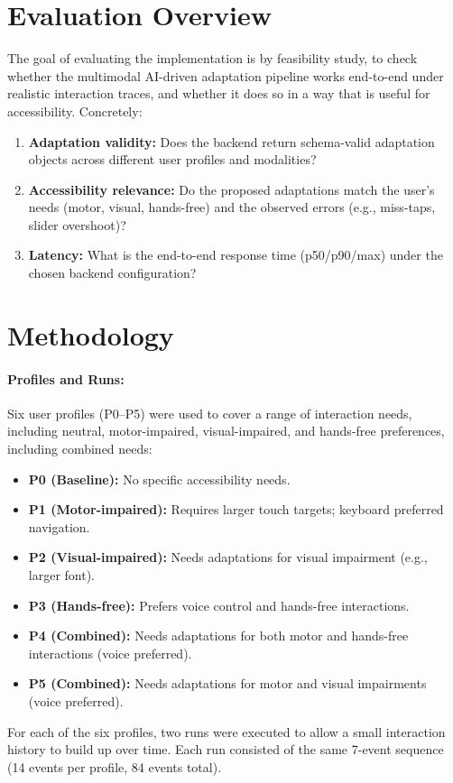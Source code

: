 \documentclass[openany]{book}
\begin{document}
\section{Evaluation Overview}
The goal of evaluating the implementation is by feasibility study, to check whether the multimodal AI-driven adaptation pipeline works end-to-end under realistic interaction traces, and whether it does so in a way that is useful for accessibility. Concretely:
\begin{enumerate}
    \item \textbf{Adaptation validity:} Does the backend return schema-valid adaptation objects across different user profiles and modalities?
    \item \textbf{Accessibility relevance:} Do the proposed adaptations match the user’s needs (motor, visual, hands-free) and the observed errors (e.g., miss-taps, slider overshoot)?
    \item \textbf{Latency:} What is the end-to-end response time (p50/p90/max) under the chosen backend configuration?
\end{enumerate}

\section{Methodology}
\paragraph{Profiles and Runs:}
Six user profiles (P0--P5) were used to cover a range of interaction needs, including neutral, motor-impaired, visual-impaired, and hands-free preferences, including combined needs:
\begin{itemize}
    \item \textbf{P0 (Baseline):} No specific accessibility needs.
    \item \textbf{P1 (Motor-impaired):} Requires larger touch targets; keyboard preferred navigation.
    \item \textbf{P2 (Visual-impaired):} Needs adaptations for visual impairment (e.g., larger font).
    \item \textbf{P3 (Hands-free):} Prefers voice control and hands-free interactions.
    \item \textbf{P4 (Combined):} Needs adaptations for both motor and hands-free interactions (voice preferred).
    \item \textbf{P5 (Combined):} Needs adaptations for motor and visual impairments (voice preferred).
\end{itemize}
For each of the six profiles, two runs were executed to allow a small interaction history to build up over time. Each run consisted of the same 7-event sequence (14 events per profile, 84 events total). 
\end{document}
